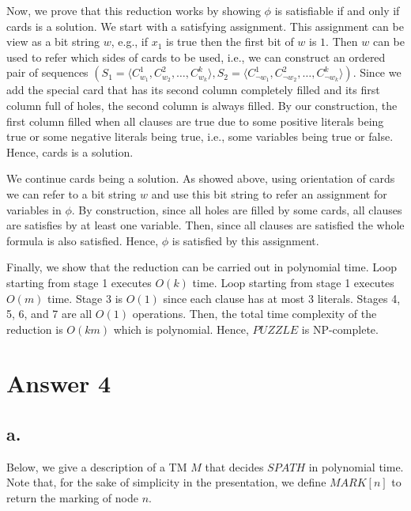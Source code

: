 \documentclass[12pt]{article}
\begin{document}
Now, we prove that this reduction works by showing $\phi$ is satisfiable if and only if \textsf{cards} is a solution. We start with a satisfying assignment. This assignment can be view as a bit string $w$, e.g., if $x_1$ is true then the first bit of $w$ is $1$. Then $w$ can be used to refer which sides of cards to be used, i.e., we can construct an ordered pair of sequences $(S_1 = \langle C^1_{w_1}, C^2_{w_2}, \ldots, C^k_{w_k} \rangle, S_2 = \langle C^1_{\neg w_1}, C^2_{\neg w_2}, \ldots, C^k_{\neg w_k} \rangle)$. Since we add the special card  that has its second column completely filled and its first column full of holes, the second column is always filled. By our construction, the first column filled when all clauses are true due to some positive literals being true or some negative literals being true, i.e., some variables being true or false. Hence, \textsf{cards} is a solution.

We continue \textsf{cards} being a solution. As showed above, using orientation of cards we can refer to a bit string $w$ and use this bit string to refer an assignment for variables in $\phi$. By construction, since all holes are filled by some cards, all clauses are satisfies by at least one variable. Then, since all clauses are satisfied the whole formula is also satisfied. Hence, $\phi$ is satisfied by this assignment.

Finally, we show that the reduction can be carried out in polynomial time. Loop starting from stage 1 executes $O(k)$ time. Loop starting from stage 1 executes $O(m)$ time. Stage 3 is $O(1)$ since each clause has at most 3 literals. Stages 4, 5, 6, and 7 are all $O(1)$ operations. Then, the total time complexity of the reduction is $O(km)$ which is polynomial. Hence, $PUZZLE$ is NP-complete.

\section*{Answer 4}

\subsection*{a.}

Below, we give a description of a TM $M$ that decides $SPATH$ in polynomial time. Note that, for the sake of simplicity in the presentation, we define $MARK[n]$ to return the marking of node $n$.
\end{document}
